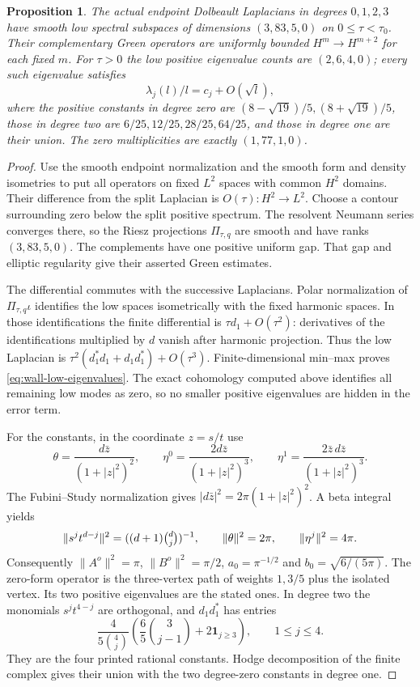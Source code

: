 \documentclass[11pt]{amsart}
\newtheorem{proposition}[theorem]{Proposition}
\theoremstyle{definition}
\theoremstyle{remark}
\begin{document}
\begin{proposition}\label{prop:wall-low-complex}
The actual endpoint Dolbeault Laplacians in degrees $0,1,2,3$ have
smooth low spectral subspaces of dimensions $(3,83,5,0)$ on
$0\le\tau<\tau_0$. Their complementary Green operators are uniformly
bounded $H^m\to H^{m+2}$ for each fixed $m$. For $\tau>0$ the
low positive eigenvalue counts are $(2,6,4,0)$; every such eigenvalue
satisfies
\begin{equation}\label{eq:wall-low-eigenvalues}
 \lambda_j(l)/l=c_j+O(\sqrt l),
\end{equation}
where the positive constants in degree zero are
$(8-\sqrt{19})/5,(8+\sqrt{19})/5$, those in degree two are
$6/25,12/25,28/25,64/25$, and those in degree one are their union.
The zero multiplicities are exactly $(1,77,1,0)$.
\end{proposition}
\begin{proof}
Use the smooth endpoint normalization and the smooth form and density
isometries to put all operators on fixed $L^2$ spaces with common
$H^2$ domains. Their difference from the split Laplacian is
$O(\tau):H^2\to L^2$. Choose a contour surrounding zero below the
split positive spectrum. The resolvent Neumann series converges there,
so the Riesz projections $\Pi_{\tau,q}$ are smooth and have ranks
$(3,83,5,0)$. The complements have one positive uniform gap.
That gap and elliptic regularity give their asserted Green estimates.

The differential commutes with the successive Laplacians. Polar
normalization of $\Pi_{\tau,q}\iota$ identifies the low spaces
isometrically with the fixed harmonic spaces. In those identifications
the finite differential is $\tau d_1+O(\tau^2)$: derivatives of
the identifications multiplied by $d$ vanish after harmonic projection.
Thus the low Laplacian is
$\tau^2(d_1^*d_1+d_1d_1^*)+O(\tau^3)$.
Finite-dimensional min--max proves \eqref{eq:wall-low-eigenvalues}.
The exact cohomology computed above identifies all remaining low
modes as zero, so no smaller positive eigenvalues are hidden in the
error term.

For the constants, in the coordinate $z=s/t$ use
\[
 \theta=\frac{d\bar z}{(1+|z|^2)^2},\qquad
 \eta^0=\frac{2d\bar z}{(1+|z|^2)^3},\qquad
 \eta^1=\frac{2\bar z\,d\bar z}{(1+|z|^2)^3}.
\]
The Fubini--Study normalization gives $|d\bar z|^2=2\pi(1+|z|^2)^2$.
A beta integral yields
\[
 \|s^jt^{d-j}\|^2=((d+1)\tbinom dj)^{-1},\qquad
 \|\theta\|^2=2\pi,\qquad \|\eta^j\|^2=4\pi.
\]
Consequently $\|A^o\|^2=\pi$, $\|B^o\|^2=\pi/2$,
$a_0=\pi^{-1/2}$ and $b_0=\sqrt{6/(5\pi)}$.
The zero-form operator is the three-vertex path of weights $1,3/5$
plus the isolated vertex. Its two positive eigenvalues are the stated
ones. In degree two the monomials $s^jt^{4-j}$ are orthogonal, and
$d_1d_1^*$ has entries
\[
 \frac{4}{5\binom4j}
 \left(\frac65\binom3{j-1}+2\mathbf1_{j\ge3}\right),
 \qquad 1\le j\le4.
\]
They are the four printed rational constants. Hodge decomposition of
the finite complex gives their union with the two degree-zero constants
in degree one.
\end{proof}
\end{document}
